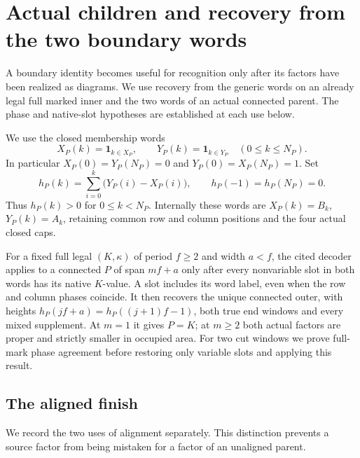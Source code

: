 \documentclass[11pt,a4paper]{amsart}
\numberwithin{equation}{section}
\theoremstyle{plain}
\theoremstyle{definition}
\newcommand{\one}{\mathbf1}
\begin{document}
\section{Actual children and recovery from the two boundary words}\label{sec:children}

A boundary identity becomes useful for recognition only after its factors
have been realized as diagrams.  We use recovery from the generic words
\cite[Recovery from the generic words]{Shields2026Gluing} on an already
legal full marked inner and the two words of an actual connected parent.
The phase and native-slot hypotheses are established at each use below.

We use the closed membership words
\[
 X_P(k)=\one_{k\in X_P},\qquad Y_P(k)=\one_{k\in Y_P}
 \quad(0\le k\le N_P).
\]
In particular \(X_P(0)=Y_P(N_P)=0\) and
\(Y_P(0)=X_P(N_P)=1\).  Set
\[
 h_P(k)=\sum_{i=0}^{k}\bigl(Y_P(i)-X_P(i)\bigr),
 \qquad h_P(-1)=h_P(N_P)=0.
\]
Thus \(h_P(k)>0\) for \(0\le k<N_P\).  Internally these words
are \(X_P(k)=B_k\), \(Y_P(k)=A_k\), retaining common row and
column positions and the four actual closed caps.

For a fixed full legal \((K,\kappa)\) of period \(f\ge2\) and
width \(a<f\), the cited decoder applies to a connected \(P\) of
span \(mf+a\) only after every nonvariable slot in both words
has its native \(K\)-value.  A slot includes its word label, even
when the row and column phases coincide.  It then recovers the unique
connected outer, with heights \(h_P(jf+a)=h_P((j+1)f-1)\),
both true end windows and every mixed supplement.  At \(m=1\) it gives
\(P=K\); at \(m\ge2\) both actual factors are proper and strictly
smaller in occupied area.  For two cut windows we prove full-mark phase
agreement before restoring only variable slots and applying this result.


\subsection{The aligned finish}

We record the two uses of alignment separately.  This distinction prevents
a source factor from being mistaken for a factor of an unaligned parent.
\end{document}
